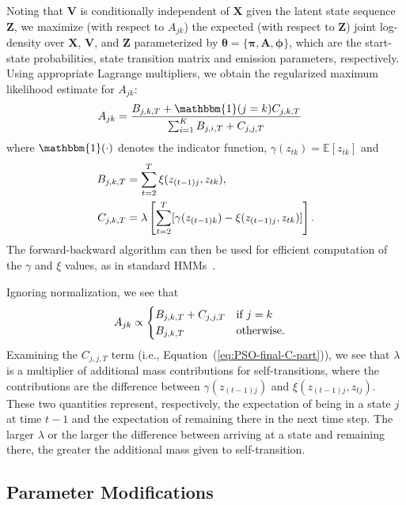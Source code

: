 \documentclass[letterpaper]{article}
\begin{document}
Noting that $\mathbf{V}$ is conditionally independent of $\mathbf{X}$ given the
latent state sequence $\mathbf{Z}$, we maximize (with respect to $A_{jk}$) the expected 
(with respect to $\mathbf{Z}$) joint log-density over $\mathbf{X}$, $\mathbf{V}$, and $\mathbf{Z}$ parameterized by
$\mathbf{\theta} = \{\mathbf{\pi},\mathbf{A}, \mathbf{\phi}\}$, which are the start-state
probabilities, state transition matrix and emission parameters, respectively. Using appropriate Lagrange multipliers, we obtain the regularized
maximum likelihood estimate for $A_{jk}$:
\begin{align}\label{eq:PSO-final}
    A_{jk} &= \frac{B_{j,k,T} + {\mathbbm{1}(j = k)}C_{j,k,T}} 
                   {\sum_{i=1}^{K} B_{j,i,T} + C_{j,j,T}}
\end{align}
where $\mathbbm{1}(\cdot)$ denotes the indicator function, $\gamma(z_{tk}) = \mathbb{E}[z_{tk}]$ and
\begin{align}\label{eq:PSO-final-C-part}
    B_{j,k,T} &= \sum_{t=2}^{T} \xi(z_{(t-1)j}, z_{tk}), \notag\\
    C_{j,k,T} &= \lambda\left[\sum_{t=2}^{T}[\gamma(z_{(t-1)k}) - \xi(z_{(t-1)j}, z_{tk})]\right].
\end{align}
The forward-backward algorithm can then be used for efficient computation of the $\gamma$ and $\xi$ values, as in standard HMMs~\cite{bishop2007pattern}.

Ignoring normalization, we see that
\begin{align*}
  \setlength{\abovedisplayskip}{0pt}
  \setlength{\belowdisplayskip}{0pt}
    A_{jk} &\propto \begin{cases} 
                B_{j,k,T} + C_{j,j,T} & \mbox{if } j=k \\ 
                B_{j,k,T} & \mbox{otherwise.}
              \end{cases}
\end{align*}
Examining the $C_{j,j,T}$ term (i.e., Equation~(\ref{eq:PSO-final-C-part})), we see that $\lambda$ is a multiplier of
additional mass contributions for self-transitions, where the contributions are
the difference between $\gamma(z_{(t-1)j})$ and $\xi(z_{(t-1)j}, z_{tj})$. These
two quantities represent, respectively, the expectation of being in a state $j$
at time $t-1$ and the expectation of remaining there in the next time step. The
larger $\lambda$ or the larger the difference between arriving at a state and
remaining there, the greater the additional mass given to self-transition.

\subsection{Parameter Modifications}
\end{document}
